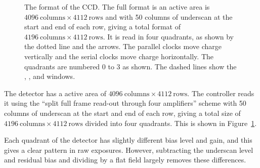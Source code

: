 \begin{figure}[p]
\begin{center}
\caption{The format of the CCD. The full format is an active area is $4096~\mbox{columns} \times 4112~\mbox{rows}$ and with 50 columns of underscan at the start and end of each row, giving a total format of $4196~\mbox{columns} \times 4112~\mbox{rows}$. It is read in four quadrants, as shown by the dotted line and the arrows. The parallel clocks move charge vertically and the serial clocks move charge horizontally. The quadrants are numbered 0 to 3 as shown. The dashed lines show the , , and  windows.}
\label{figure:format}
\end{center}
\end{figure}

The detector has a active area of  $4096~\mbox{columns} \times 4112~\mbox{rows}$. The controller reads it using the “split full frame read-out through four amplifiers” scheme \cite[p.~17]{e2v} with 50 columns of underscan at the start and end of each row, giving a total size of $4196~\mbox{columns} \times 4112~\mbox{rows}$ divided into four quadrants. This is shown in Figure~\ref{figure:format}.

Each quadrant of the detector has slightly different bias level and gain, and this gives a clear pattern in raw exposures. However, subtracting the underscan level and residual bias and dividing by a flat field largely removes these differences.

